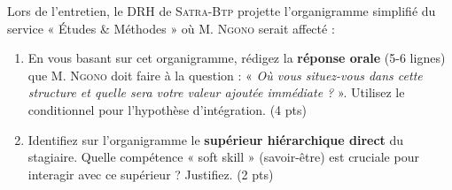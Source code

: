 \documentclass[11pt]{article}
\begin{document}
\begin{exercice}
Lors de l'entretien, le DRH de \textsc{Satra-Btp} projette l'organigramme simplifié du service « Études \& Méthodes » où M. \textsc{Ngono} serait affecté :
\begin{center}
\end{center}
\begin{enumerate}
    \item En vous basant sur cet organigramme, rédigez la \textbf{réponse orale} (5-6 lignes) que M. \textsc{Ngono} doit faire à la question : « \textit{Où vous situez-vous dans cette structure et quelle sera votre valeur ajoutée immédiate ?} ». Utilisez le conditionnel pour l'hypothèse d'intégration. \hfill (4 pts)
    \item Identifiez sur l'organigramme le \textbf{supérieur hiérarchique direct} du stagiaire. Quelle compétence « soft skill » (savoir-être) est cruciale pour interagir avec ce supérieur ? Justifiez. \hfill (2 pts)
\end{enumerate}
\end{exercice}
\end{document}
